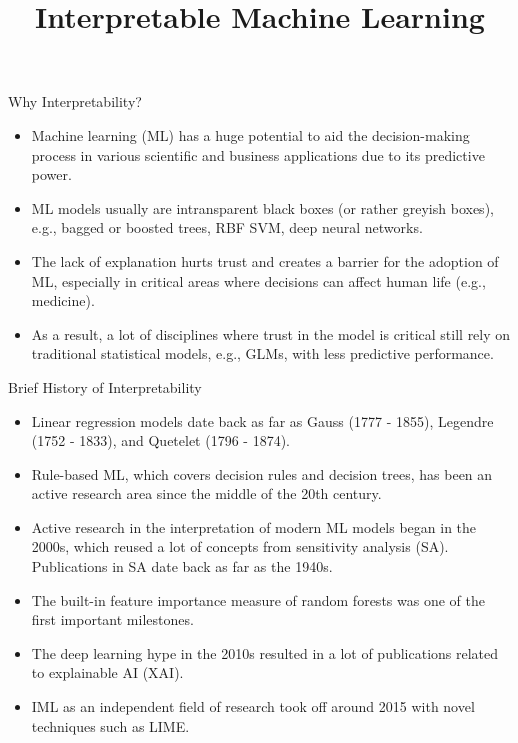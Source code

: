 \documentclass[11pt,compress,t,notes=noshow, xcolor=table]{beamer}
\title{Interpretable Machine Learning}
\institute{\href{https://compstat-lmu.github.io/lecture_iml/}{compstat-lmu.github.io/lecture\_iml}}
\date{}
\begin{document}


\newcommand{\titlefigure}{figure/open_blackbox}
\newcommand{\learninggoals}{
\item Why do we need interpretability?
\item What have been the developments until now?}





\begin{vbframe}{Why Interpretability?}

\begin{itemize}
  \item  Machine learning (ML) has a huge potential to aid the decision-making process in various scientific and business applications due to its predictive power.
  \item ML models usually are intransparent black boxes (or rather greyish boxes), 
  e.g., bagged or boosted trees, RBF SVM, deep neural networks.
  \item The lack of explanation hurts trust and creates a barrier for the adoption of ML, especially in critical areas where decisions can affect human life (e.g., medicine).
  \item As a result, a lot of disciplines where trust in the model is critical still rely on traditional statistical models, e.g., GLMs, with less predictive performance.
\end{itemize}

\end{vbframe}



\begin{vbframe}{Brief History of Interpretability}
\begin{itemize}
\item Linear regression models date back as far as Gauss (1777 - 1855), Legendre (1752 - 1833), and Quetelet (1796 - 1874).
\item Rule-based ML, which covers decision rules and decision trees, has been an active research area since the middle of the 20th century.
\item Active research in the interpretation of modern ML models began in the 2000s, which reused a lot of concepts from sensitivity analysis (SA). Publications in SA date back as far as the 1940s.
\item The built-in feature importance measure of random forests was one of the first important milestones.
\item The deep learning hype in the 2010s resulted in a lot of publications related to explainable AI (XAI).
\item IML as an independent field of research took off around 2015 with novel techniques such as LIME. 
\end{itemize}
\end{vbframe}
\end{document}
